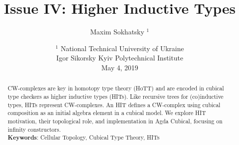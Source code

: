\documentclass{article}
\theoremstyle{definition}
\begin{document}
\title{Issue IV: Higher Inductive Types}
\author{Maxim Sokhatsky $^1$}
\date{ $^1$ National Technical University of Ukraine \\
       \small Igor Sikorsky Kyiv Polytechnical Institute \\
       May 4, 2019 }
\maketitle

\begin{abstract}
CW-complexes are key in homotopy type theory (HoTT) and are encoded
in cubical type checkers as higher inductive types (HITs). Like
recursive trees for (co)inductive types, HITs represent CW-complexes.
An HIT defines a CW-complex using cubical composition as an initial
algebra element in a cubical model. We explore HIT motivation, their
topological role, and implementation in Agda Cubical, focusing on infinity constructors. \\
{\bf Keywords}: Cellular Topology, Cubical Type Theory, HITs
\end{abstract}

\tableofcontents
\end{document}
